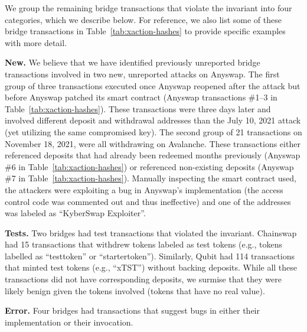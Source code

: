 We group the remaining bridge transactions that violate the invariant
into four categories, which we describe below.  For reference, we also
list some of these bridge transactions in
Table~\ref{tab:xaction-hashes} to provide specific
examples with more detail.



\newcommand{\pgraph}[1]{\vspace*{0.1in}\noindent\textbf{#1}}

\pgraph{New.}  We believe that we have identified
previously unreported bridge transactions involved in two new,
unreported attacks on Anyswap.
The first group of three transactions executed once Anyswap reopened
after the attack but before Anyswap patched its smart contract
(Anyswap transactions \#1--3 in Table~\ref{tab:xaction-hashes}).  These transactions were three days later and involved
different deposit and withdrawal addresses than the July 10, 2021
attack (yet utilizing the same compromised key).  The second group of 21 transactions on November 18, 2021,
were all withdrawing on Avalanche.  These
transactions either referenced deposits that had already been redeemed
months previously (Anyswap \#6 in Table~\ref{tab:xaction-hashes}) or referenced non-existing deposits (Anyswap \#7 in Table~\ref{tab:xaction-hashes}).  Manually
inspecting the smart contract used, the attackers were exploiting a
bug in Anyswap's implementation (the access control code was commented
out and thus ineffective) and one of the addresses was labeled as ``KyberSwap Exploiter''. 


\pgraph{Tests.}  Two bridges had test transactions that violated the
invariant.
%
Chainswap had 15 transactions that withdrew tokens labeled as test
tokens (e.g., tokens labelled as ``testtoken'' or ``startertoken''). Similarly, Qubit had 114 transactions that minted test tokens (e.g., ``xTST'') without backing deposits.
While all these transactions did not have corresponding deposits, we surmise that they were likely benign given the tokens involved (tokens that have no real value).




\pgraph{Error.} Four bridges had transactions that suggest bugs in
either their implementation or their invocation.

